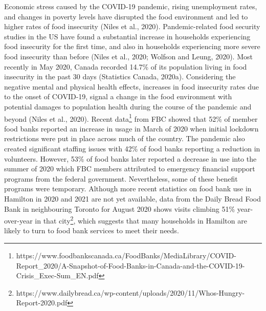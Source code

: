\documentclass[]{elsarticle} %
\begin{document}
Economic stress caused by the COVID-19 pandemic, rising unemployment
rates, and changes in poverty levels have disrupted the food environment
and led to higher rates of food insecurity (Niles et al., 2020).
Pandemic-related food security studies in the US have found a
substantial increase in households experiencing food insecurity for the
first time, and also in households experiencing more severe food
insecurity than before (Niles et al., 2020; Wolfson and Leung, 2020).
Most recently in May 2020, Canada recorded 14.7\% of its population
living in food insecurity in the past 30 days (Statistics Canada,
2020a). Considering the negative mental and physical health effects,
increases in food insecurity rates due to the onset of COVID-19, signal
a change in the food environment with potential damages to population
health during the course of the pandemic and beyond (Niles et al.,
2020). Recent data\footnote{https://www.foodbankscanada.ca/FoodBanks/MediaLibrary/COVID-Report\_2020/A-Snapshot-of-Food-Banks-in-Canada-and-the-COVID-19-Crisis\_Exec-Sum\_EN.pdf}
from FBC showed that 52\% of member food banks reported an increase in
usage in March of 2020 when initial lockdown restrictions were put in
place across much of the country. The pandemic also created significant
staffing issues with 42\% of food banks reporting a reduction in
volunteers. However, 53\% of food banks later reported a decrease in use
into the summer of 2020 which FBC members attributed to emergency
financial support programs from the federal government. Nevertheless,
some of these benefit programs were temporary. Although more recent
statistics on food bank use in Hamilton in 2020 and 2021 are not yet
available, data from the Daily Bread Food Bank in neighbouring Toronto
for August 2020 shows visits climbing 51\% year-over-year in that
city\footnote{https://www.dailybread.ca/wp-content/uploads/2020/11/Whos-Hungry-Report-2020.pdf},
which suggests that many households in Hamilton are likely to turn to
food bank services to meet their needs.
\end{document}
